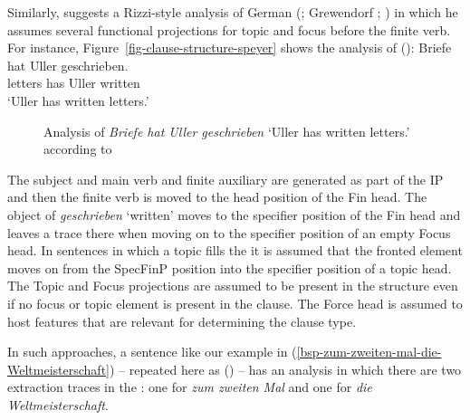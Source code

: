 Similarly, \citet{Speyer2008a} suggests a Rizzi-style analysis of German (\citealp{Rizzi97a-u};
Grewendorf \citeyear[, 240]{Grewendorf2002a}; \citeyear{Grewendorf2009a}) in which he
assumes several functional projections for topic and focus before the finite verb. For instance,
Figure~\vref{fig-clause-structure-speyer} shows the analysis of ():
\ea
\gll Briefe hat Uller geschrieben.\\
     letters has Uller written\\
\glt `Uller has written letters.'
\z
\begin{figure}
\caption{Analysis of \emph{Briefe hat Uller geschrieben} `Uller has written letters.' according to
  \citet[]{Speyer2008a}}\label{fig-clause-structure-speyer}
\end{figure}
The subject and main verb and finite auxiliary are generated as part of the IP and then the finite
verb is moved to the head position of the Fin head. The object of \emph{geschrieben} `written' moves
to the specifier position of the Fin head and leaves a trace there when moving on to the specifier
position of an empty Focus head. In sentences in which a topic fills the \vf it is assumed that the
fronted element moves on from the SpecFinP position into the specifier position of a topic head. The
Topic and Focus projections are assumed to be present in the structure even if no focus or topic element is present
in the clause. The Force head is assumed to host features that are relevant for determining the
clause type.

In such approaches, a sentence like our example in
(\ref{bsp-zum-zweiten-mal-die-Weltmeisterschaft}) -- repeated here as () -- has an analysis
in which there are two extraction traces in the \mf: one for \emph{zum zweiten Mal} and one for
\emph{die Weltmeisterschaft}.


